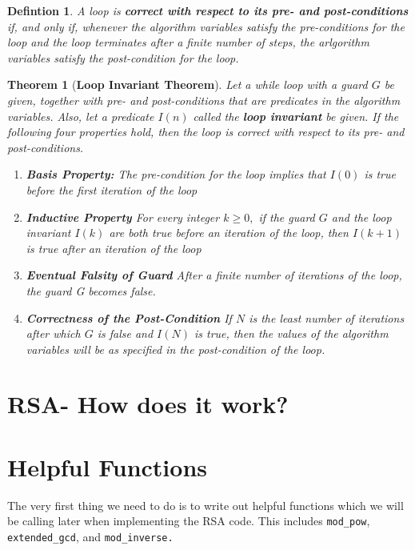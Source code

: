 \documentclass{article}
\newtheorem{theorem}{Theorem}[section]
\newtheorem{definition}{Defintion}[section]
\begin{document}
	\begin{definition}
	A loop is \textbf{correct with respect to its pre- and post-conditions} if, and only if, whenever the algorithm variables satisfy the pre-conditions for the loop and the loop terminates after a finite number of steps, the arlgorithm variables satisfy the post-condition for the loop.
	\end{definition}
	\begin{theorem}[\textbf{Loop Invariant Theorem}]
	Let a while loop with a guard $G$ be given, together with pre- and post-conditions that are predicates in the algorithm variables. Also, let a predicate $I(n)$ called the \textbf{loop invariant} be given. If the following four properties hold, then the loop is correct with respect to its pre- and post-conditions.
	\begin{enumerate}
		\item \textbf{Basis Property:} The pre-condition for the loop implies that $I(0)$ is true before the first iteration of the loop
		\item \textbf{Inductive Property} For every integer $k \geq 0,$ if the guard $G$ and the loop invariant $I(k)$ are both true before an iteration of the loop, then $I(k+1)$ is true after an iteration of the loop
		\item \textbf{Eventual Falsity of Guard} After a finite number of iterations of the loop, the guard G becomes false.
		\item \textbf{Correctness of the Post-Condition} If $N$ is the least number of iterations after which $G$ is false and $I(N)$ is true, then the values of the algorithm variables will be as specified in the post-condition of the loop.
	\end{enumerate}
	\end{theorem}
	
	
	
	
	\section{RSA- How does it work?}
	
	\section{Helpful Functions}
	
	The very first thing we need to do is to write out helpful functions which we will be calling later when implementing the RSA code. This includes \texttt{mod\_pow}, \texttt{extended\_gcd}, and \texttt{mod\_inverse.}
	
\end{document}
